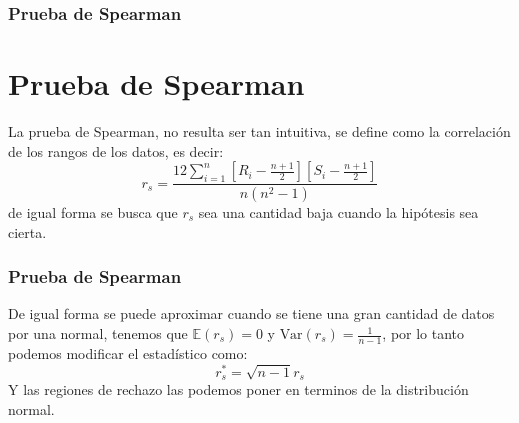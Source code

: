 \documentclass[aspectratio=169,spanish]{beamer}
\begin{document}
\begin{frame}
\frametitle{Prueba de Spearman}
\section{Prueba de Spearman}
La prueba de Spearman, no resulta ser tan intuitiva, se define como la correlación de los rangos de los datos, es decir:
$$ r_s = \frac{12\sum_{i=1}^{n}[R_i -\frac{n+1}{2}][S_i -\frac{n+1}{2}]}{n(n^2-1)}$$
de igual forma se busca que $ r_s$ sea una cantidad baja cuando la hipótesis sea cierta.
\end{frame}


\begin{frame}
\frametitle{Prueba de Spearman}
De igual forma se puede aproximar cuando se tiene una gran cantidad de datos por una normal, tenemos que $\mathbb{E}(r_s)=0$ y $\text{Var}(r_s)=\frac{1}{n-1}$, por lo tanto podemos modificar el estadístico como:
$$ r_s^* = \sqrt{n-1}r_s$$
Y las regiones de rechazo las podemos poner en terminos de la distribución normal.
\end{frame}
\end{document}
